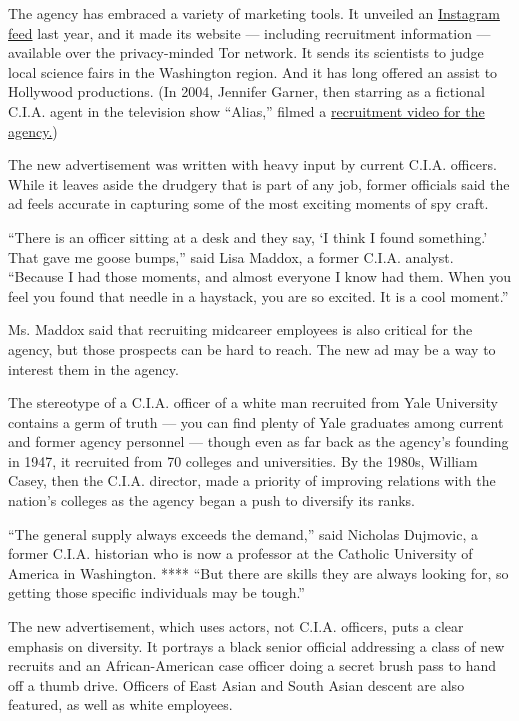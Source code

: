 The agency has embraced a variety of marketing tools. It unveiled an
\href{https://www.instagram.com/cia/}{Instagram feed} last year, and it
made its website --- including recruitment information --- available
over the privacy-minded Tor network. It sends its scientists to judge
local science fairs in the Washington region. And it has long offered an
assist to Hollywood productions. (In 2004, Jennifer Garner, then
starring as a fictional C.I.A. agent in the television show ``Alias,''
filmed a \href{https://www.youtube.com/watch?v=eESpdvcyTUw}{recruitment
video for the agency.})

The new advertisement was written with heavy input by current C.I.A.
officers. While it leaves aside the drudgery that is part of any job,
former officials said the ad feels accurate in capturing some of the
most exciting moments of spy craft.

``There is an officer sitting at a desk and they say, `I think I found
something.' That gave me goose bumps,'' said Lisa Maddox, a former
C.I.A. analyst. ``Because I had those moments, and almost everyone I
know had them. When you feel you found that needle in a haystack, you
are so excited. It is a cool moment.''

Ms. Maddox said that recruiting midcareer employees is also critical for
the agency, but those prospects can be hard to reach. The new ad may be
a way to interest them in the agency.

The stereotype of a C.I.A. officer of a white man recruited from Yale
University contains a germ of truth --- you can find plenty of Yale
graduates among current and former agency personnel --- though even as
far back as the agency's founding in 1947, it recruited from 70 colleges
and universities. By the 1980s, William Casey, then the C.I.A. director,
made a priority of improving relations with the nation's colleges as the
agency began a push to diversify its ranks.

``The general supply always exceeds the demand,'' said Nicholas
Dujmovic, a former C.I.A. historian who is now a professor at the
Catholic University of America in Washington. **** ``But there are
skills they are always looking for, so getting those specific
individuals may be tough.''

The new advertisement, which uses actors, not C.I.A. officers, puts a
clear emphasis on diversity. It portrays a black senior official
addressing a class of new recruits and an African-American case officer
doing a secret brush pass to hand off a thumb drive. Officers of East
Asian and South Asian descent are also featured, as well as white
employees.

